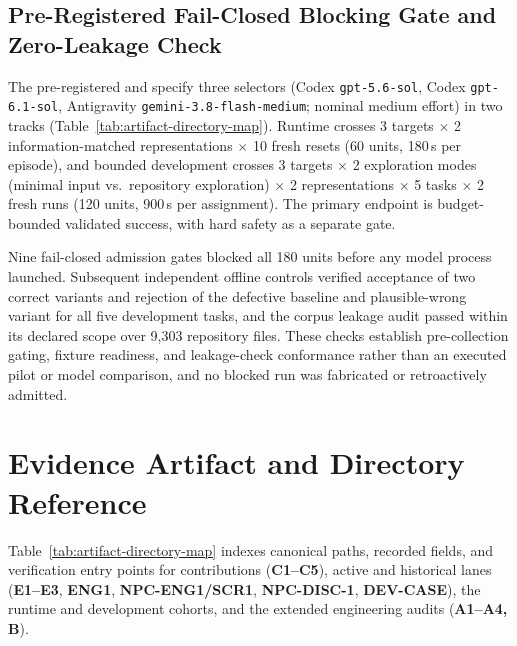 \documentclass[journal]{IEEEtran}
\begin{document}
\subsection{Pre-Registered Fail-Closed Blocking Gate and Zero-Leakage Check}\label{sec:prospective-pilot}
The pre-registered  and  specify three selectors (Codex \texttt{gpt-5.6-sol}, Codex \texttt{gpt-6.1-sol}, Antigravity \texttt{gemini-3.8-flash-medium}; nominal medium effort) in two tracks (Table~\ref{tab:artifact-directory-map}). Runtime crosses 3 targets $\times$ 2 information-matched representations $\times$ 10 fresh resets (60 units, 180\,s per episode), and bounded development crosses 3 targets $\times$ 2 exploration modes (minimal input vs.\ repository exploration) $\times$ 2 representations $\times$ 5 tasks $\times$ 2 fresh runs (120 units, 900\,s per assignment). The primary endpoint is budget-bounded validated success, with hard safety as a separate gate.



Nine fail-closed admission gates blocked all 180 units before any model process launched. Subsequent independent offline controls verified acceptance of two correct variants and rejection of the defective baseline and plausible-wrong variant for all five development tasks, and the corpus leakage audit passed within its declared scope over 9,303 repository files. These checks establish pre-collection gating, fixture readiness, and leakage-check conformance rather than an executed pilot or model comparison, and no blocked run was fabricated or retroactively admitted.
\clearpage

\section{Evidence Artifact and Directory Reference}\label{app:artifact-map}
Table~\ref{tab:artifact-directory-map} indexes canonical paths, recorded fields, and verification entry points for contributions (\textbf{C1--C5}), active and historical lanes (\textbf{E1--E3}, \textbf{ENG1}, \textbf{NPC-ENG1/SCR1}, \textbf{NPC-DISC-1}, \textbf{DEV-CASE}), the runtime and development cohorts, and the extended engineering audits (\textbf{A1--A4, B}).
\end{document}

